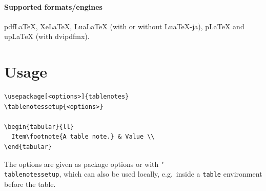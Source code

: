 \documentclass{article}
\newcommand*\cs[1]{\texttt{\char`\\#1}}
\begin{document}
\paragraph{Supported formats/engines}
pdf\LaTeX, Xe\LaTeX, Lua\LaTeX{} (with or without Lua\TeX-ja),
p\LaTeX{} and up\LaTeX{} (with dvipdfmx).

\section{Usage}

\begin{verbatim}
\usepackage[<options>]{tablenotes}
\tablenotessetup{<options>}

\begin{tabular}{ll}
  Item\footnote{A table note.} & Value \\
\end{tabular}
\end{verbatim}

\noindent
The options are given as package options or with \cs{tablenotessetup},
which can also be used locally, e.g.\ inside a \texttt{table}
environment before the table.
\end{document}
